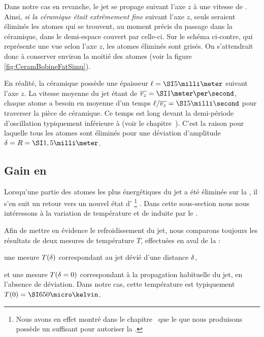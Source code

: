  Dans notre cas en revanche, le jet se propage suivant l'axe $z$ à une vitesse de . Ainsi, \emph{si la céramique était extrêmement fine} suivant l'axe $z$, seuls seraient éliminés les atomes qui se trouvent, au moment précis du passage dans la céramique, dans le demi-espace couvert par celle-ci. 
\noindent Sur le schéma ci-contre, qui représente une vue selon l'axe $z$, les atomes éliminés sont grisés. On s'attendrait donc à conserver environ la moitié des atomes (voir la figure \vref{fig:CeramBobineFatSimu}).

\ApplicationNumerique
{
\noindent En réalité, la céramique possède une épaisseur $\CeramLong=\mm{5}$ suivant l'axe $z$. La vitesse moyenne du jet étant de $\vjet=\mps{1}$, chaque atome a besoin en moyenne d'un temps $\ttfrac{\CeramLong}{\vjet}=\ms{5}$ pour traverser la pièce de céramique. Ce temps est long devant la demi-période d'oscillation typiquement inférieure à  (voir le chapitre~). C'est la raison pour laquelle tous les atomes sont éliminés pour une déviation d'amplitude $\Devi=\CeramRay=\mm{1,5}$.
}

\subsection{Gain en \ddedpup}\label{sec:ResultatVariationDDEDPUP}

Lorsqu'une partie des atomes les plus énergétiques du jet a été éliminée sur la \pdec, il s'en suit un retour vers un nouvel état d'\eqthdy%
\footnote{Nous avons en effet montré dans le chapitre~ que le \jat que nous produisons possède un \tcolel suffisant pour autoriser la \reth.}%
.
Dans cette sous-section nous nous intéressons à la variation de température et de \ddedpup induite par le \fisp. 

\noindent Afin de mettre en évidence le refroidissement du jet, nous comparons toujours les résultats de deux mesures de température $T$, effectuées  en aval de la \pdec :
\begin{itemizel}
	\item une mesure $T({\delta})$ correspondant au jet dévié d'une distance ${\delta}$,
	\item et une mesure $T({\delta}=0)$ correspondant à la propagation habituelle du jet, \cad en l'absence de déviation. Dans notre cas, cette température est typiquement $T(0)=\microK{650}$.
\end{itemizel}



